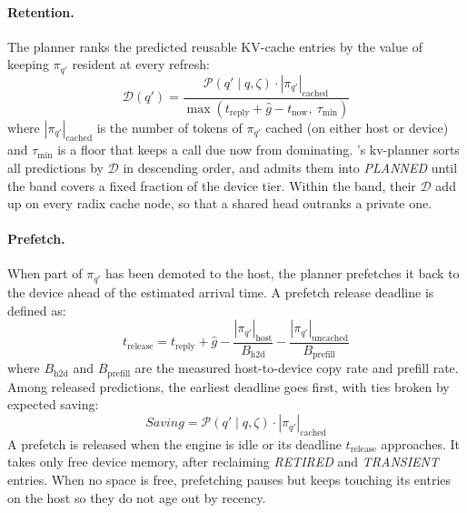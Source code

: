 \paragraph{Retention.}
The planner ranks the predicted reusable KV-cache entries by the value of keeping $\pi_{q'}$ resident at every refresh:
\[
\mathcal{D}(q')=\frac{\mathcal{P}(q'\mid q,\zeta)\cdot |\pi_{q'}|_{\mathrm{cached}}}{\max\!\left(t_{\mathrm{reply}}+\hat{g}-t_{\mathrm{now}},\ \tau_{\min}\right)}
\]
where $|\pi_{q'}|_{\mathrm{cached}}$ is the number of tokens of $\pi_{q'}$ cached (on either host or device) and $\tau_{\min}$ is a floor that keeps a call due now from dominating. \sysname's kv-planner sorts all predictions by $\mathcal{D}$ in descending order, and admits them into \emph{PLANNED} until the band covers a fixed fraction of the device tier. Within the band, their $\mathcal{D}$ add up on every radix cache node, so that a shared head outranks a private one.

\paragraph{Prefetch.}
When part of $\pi_{q'}$ has been demoted to the host, the planner prefetches it back to the device ahead of the estimated arrival time. A prefetch release deadline is defined as: 
\[
t_{\mathrm{release}}=t_{\mathrm{reply}}+\hat{g}-\frac{|\pi_{q'}|_{\mathrm{host}}}{B_{\mathrm{h2d}}}-\frac{|\pi_{q'}|_{\mathrm{uncached}}}{B_{\mathrm{prefill}}}
\]
where $B_{\mathrm{h2d}}$ and $B_{\mathrm{prefill}}$ are the measured host-to-device copy rate and prefill rate. Among released predictions, the earliest deadline goes first, with ties broken by expected saving:
\[
\textit{Saving}=\mathcal{P}(q'\mid q,\zeta)\cdot|\pi_{q'}|_{\mathrm{cached}}
\]
A prefetch is released when the engine is idle or its deadline $t_{\mathrm{release}}$ approaches. It takes only free device memory, after reclaiming \emph{RETIRED} and \emph{TRANSIENT} entries. When no space is free, prefetching pauses but keeps touching its entries on the host so they do not age out by recency. 

